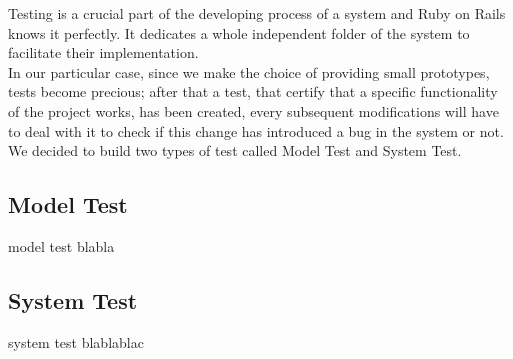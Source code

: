 Testing is a crucial part of the developing process of a system and Ruby on Rails knows it perfectly. It dedicates a whole independent folder of the system to facilitate their implementation. \\
In our particular case, since we make the choice of providing small prototypes, tests become precious; after that a test, that certify that a specific functionality of the project works, has been created, every subsequent modifications will have to deal with it to check if this change has introduced a bug in the system or not. \\
We decided to build two types of test called Model Test and System Test.

\subsection{Model Test}
model test blabla

\subsection{System Test}
system test blablablac
